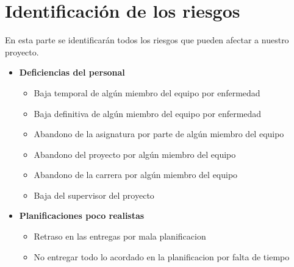 \documentclass[spanish,a4paper,11pt, twoside]{report}	%
\begin{document}
\part{Identificación de los riesgos}
En esta parte se identificarán todos los riesgos que pueden afectar a nuestro proyecto.
\begin{itemize}
\item \textbf {Deficiencias del personal}
	\begin{itemize}
		\item {Baja temporal de algún miembro del equipo por enfermedad}
		\item {Baja definitiva de algún miembro del equipo por enfermedad}
		\item {Abandono de la asignatura por parte de algún miembro del equipo}
		\item {Abandono del proyecto por algún miembro del equipo}
		\item {Abandono de la carrera por algún miembro del equipo}
		\item {Baja del supervisor del proyecto}
	\end{itemize}
\item \textbf {Planificaciones poco realistas}
	\begin{itemize}
		\item {Retraso en las entregas por mala planificacion}
		\item {No entregar todo lo acordado en la planificacion por falta de tiempo}


\end{itemize}
\end{itemize}
\end{document}
